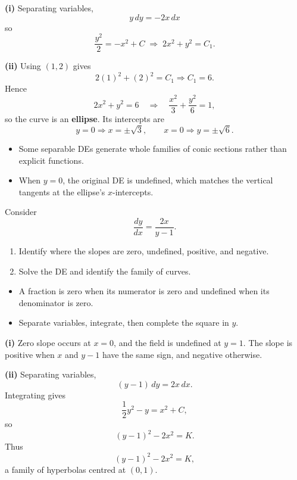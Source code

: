 \begin{solution}
\textbf{(i)} Separating variables,
\[
y\,dy=-2x\,dx
\]
so
\[
\frac{y^2}{2}=-x^2+C \;\Longrightarrow\; \boxed{2x^2+y^2=C_1}.
\]

\textbf{(ii)} Using $(1,2)$ gives
\[
2(1)^2+(2)^2=C_1 \Rightarrow C_1=6.
\]
Hence
\[
2x^2+y^2=6
\quad\Longrightarrow\quad
\frac{x^2}{3}+\frac{y^2}{6}=1,
\]
so the curve is an \textbf{ellipse}. Its intercepts are
\[
y=0 \Rightarrow x=\pm\sqrt{3}, \qquad x=0 \Rightarrow y=\pm\sqrt{6}.
\]
\end{solution}

\begin{takeaways}
\begin{itemize}[leftmargin=*]
    \item Some separable DEs generate whole families of conic sections rather than explicit functions.
    \item When $y=0$, the original DE is undefined, which matches the vertical tangents at the ellipse's $x$-intercepts.
\end{itemize}
\end{takeaways}

\begin{problem}
Consider
\[
\frac{dy}{dx}=\frac{2x}{y-1}.
\]
\begin{enumerate}
    \item[\textbf{i}] Identify where the slopes are zero, undefined, positive, and negative.
    \item[\textbf{ii}] Solve the DE and identify the family of curves.
\end{enumerate}
\end{problem}

\begin{hint}
\begin{itemize}[leftmargin=*]
    \item A fraction is zero when its numerator is zero and undefined when its denominator is zero.
    \item Separate variables, integrate, then complete the square in $y$.
\end{itemize}
\end{hint}

\begin{solution}
\textbf{(i)} Zero slope occurs at $x=0$, and the field is undefined at $y=1$. The slope is positive when $x$ and $y-1$ have the same sign, and negative otherwise.

\textbf{(ii)} Separating variables,
\[
(y-1)\,dy=2x\,dx.
\]
Integrating gives
\[
\frac12y^2-y=x^2+C,
\]
so
\[
(y-1)^2-2x^2=K.
\]
Thus
\[
\boxed{(y-1)^2-2x^2=K},
\]
a family of hyperbolas centred at $(0,1)$.
\end{solution}

